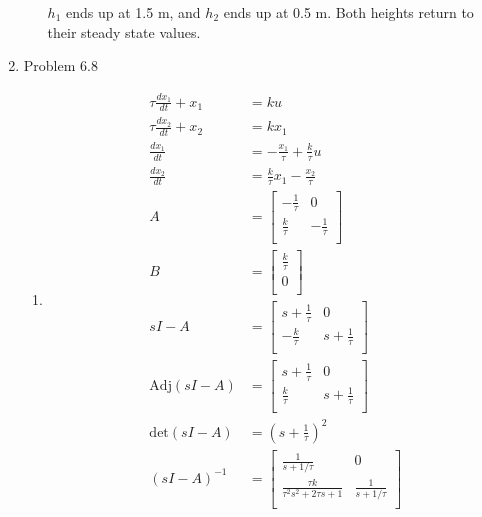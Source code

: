 \documentclass[12pt]{article}
\begin{document}
\begin{enumerate}
\begin{enumerate}
$h_1$ ends up at 1.5 m, and $h_2$ ends up at 0.5 m. Both heights return to their steady state values.
\end{enumerate}


\newpage
\item Problem 6.8
\begin{enumerate}
    \item 
    \begin{align*}
        \tau \frac{dx_1}{dt} + x_1 &= ku \\
        \tau \frac{dx_2}{dt} + x_2 &= kx_1 \\
        \frac{dx_1}{dt} &= -\frac{x_1}{\tau} + \frac{k}{\tau} u \\
        \frac{dx_2}{dt} &= \frac{k}{\tau} x_1 - \frac{x_2}{\tau} \\
        A &= \begin{bmatrix}
            -\frac{1}{\tau} & 0 \\
            \frac{k}{\tau} & -\frac{1}{\tau} \\
        \end{bmatrix} \\
        B &= \begin{bmatrix}
            \frac{k}{\tau} \\
            0 \\
        \end{bmatrix} \\
        sI-A &= \begin{bmatrix}
            s+\frac{1}{\tau} & 0 \\
            -\frac{k}{\tau} & s+\frac{1}{\tau} \\
        \end{bmatrix} \\
        \mathrm{Adj}(sI-A) &= \begin{bmatrix}
            s+\frac{1}{\tau} & 0 \\
            \frac{k}{\tau} & s+\frac{1}{\tau} \\
        \end{bmatrix} \\
        \mathrm{det}(sI-A) &= (s+\frac{1}{\tau})^2 \\
        (sI-A)^{-1} &= \begin{bmatrix}
            \frac{1}{s+1/\tau} & 0 \\
            \frac{\tau k}{\tau^2s^2+2\tau s + 1} & \frac{1}{s+1/\tau} \\

\end{bmatrix}
\end{align*}
\end{enumerate}
\end{enumerate}
\end{document}
